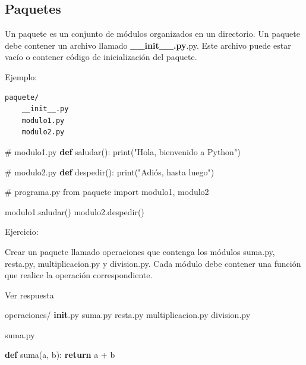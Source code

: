 \documentclass[
  a4paper,
  DIV=11,
  numbers=noendperiod,
  onepage,
  openany]{scrreprt}
\newenvironment{Shaded}{\begin{snugshade}}{\end{snugshade}}
\newcommand{\BuiltInTok}[1]{\textcolor[rgb]{0.00,0.23,0.31}{#1}}
\newcommand{\CommentTok}[1]{\textcolor[rgb]{0.37,0.37,0.37}{#1}}
\newcommand{\ControlFlowTok}[1]{\textcolor[rgb]{0.00,0.23,0.31}{\textbf{#1}}}
\newcommand{\ImportTok}[1]{\textcolor[rgb]{0.00,0.46,0.62}{#1}}
\newcommand{\KeywordTok}[1]{\textcolor[rgb]{0.00,0.23,0.31}{\textbf{#1}}}
\newcommand{\NormalTok}[1]{\textcolor[rgb]{0.00,0.23,0.31}{#1}}
\newcommand{\OperatorTok}[1]{\textcolor[rgb]{0.37,0.37,0.37}{#1}}
\newcommand{\StringTok}[1]{\textcolor[rgb]{0.13,0.47,0.30}{#1}}
\begin{document}
\begin{tcolorbox}
\chapter{Paquetes}\label{paquetes}

Un paquete es un conjunto de módulos organizados en un directorio. Un
paquete debe contener un archivo llamado \textbf{\_\_init\_\_.py}.py.
Este archivo puede estar vacío o contener código de inicialización del
paquete.

Ejemplo:

\begin{verbatim}
paquete/
    __init__.py
    modulo1.py
    modulo2.py
\end{verbatim}

\begin{Shaded}
\begin{Highlighting}[]
\CommentTok{\# modulo1.py}
\KeywordTok{def}\NormalTok{ saludar():}
    \BuiltInTok{print}\NormalTok{(}\StringTok{"Hola, bienvenido a Python"}\NormalTok{)}
\end{Highlighting}
\end{Shaded}

\begin{Shaded}
\begin{Highlighting}[]
\CommentTok{\# modulo2.py}
\KeywordTok{def}\NormalTok{ despedir():}
    \BuiltInTok{print}\NormalTok{(}\StringTok{"Adiós, hasta luego"}\NormalTok{)}
\end{Highlighting}
\end{Shaded}

\begin{Shaded}
\begin{Highlighting}[]
\CommentTok{\# programa.py}
\ImportTok{from}\NormalTok{ paquete }\ImportTok{import}\NormalTok{ modulo1, modulo2}

\NormalTok{modulo1.saludar()}
\NormalTok{modulo2.despedir()}
\end{Highlighting}
\end{Shaded}

Ejercicio:

Crear un paquete llamado operaciones que contenga los módulos suma.py,
resta.py, multiplicacion.py y division.py. Cada módulo debe contener una
función que realice la operación correspondiente.

Ver respuesta

operaciones/ \textbf{init}.py suma.py resta.py multiplicacion.py
division.py

suma.py

\begin{Shaded}
\begin{Highlighting}[]
\KeywordTok{def}\NormalTok{ suma(a, b):}
    \ControlFlowTok{return}\NormalTok{ a }\OperatorTok{+}\NormalTok{ b}
\end{Highlighting}
\end{Shaded}


\end{tcolorbox}
\end{document}
